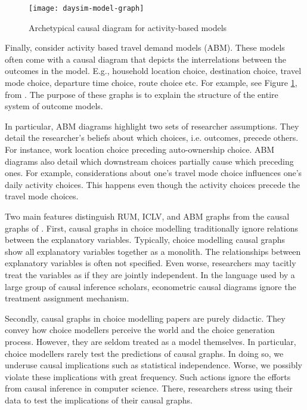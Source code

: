 \begin{figure}
   \centering
   \texttt{[image: daysim-model-graph]}
   \caption{Archetypical causal diagram for activity-based models}
   \label{fig:example-graph-abm}
\end{figure}

Finally, consider activity based travel demand models (ABM).
These models often come with a causal diagram that depicts the interrelations between the outcomes in the model.
E.g., household location choice, destination choice, travel mode choice, departure time choice, route choice etc.
For example, see Figure \ref{fig:example-graph-abm}, from \citet[Fig. 2]{bradley_2010_sacsim}.
The purpose of these graphs is to explain the structure of the entire system of outcome models.

In particular, ABM diagrams highlight two sets of researcher assumptions.
They detail the researcher's beliefs about which choices, i.e. outcomes, precede others.
For instance, work location choice preceding auto-ownership choice.
ABM diagrams also detail which downstream choices partially cause which preceding ones.
For example, considerations about one's travel mode choice influences one's daily activity choices.
This happens even though the activity choices precede the travel mode choices.

Two main features distinguish RUM, ICLV, and ABM graphs from the causal graphs of \citet{pearl_1995_causal}.
First, causal graphs in choice modelling traditionally ignore relations between the explanatory variables.
Typically, choice modelling causal graphs show all explanatory variables together as a monolith.
The relationships between explanatory variables is often not specified.
Even worse, researchers may tacitly treat the variables as if they are jointly independent.
In the language used by a large group of causal inference scholars, econometric causal diagrams ignore the treatment assignment mechanism.

Secondly, causal graphs in choice modelling papers are purely didactic.
They convey how choice modellers perceive the world and the choice generation process.
However, they are seldom treated as a model themselves.
In particular, choice modellers rarely test the predictions of causal graphs.
In doing so, we underuse causal implications such as statistical independence.
Worse, we possibly violate these implications with great frequency.
Such actions ignore the efforts from causal inference in computer science.
There, researchers stress using their data to test the implications of their causal graphs.

